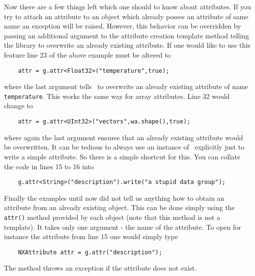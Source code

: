 Now there are a few things left which one should to know about attributes. 
If you try to attach an attribute to an object which already posses an attribute
of same name an exception will be raised. However, this behavior can be
overridden by passing an additional argument to the attribute creation template
method telling the library to overwrite an already existing attribute. 
If one would like to use this feature line 23 of the above example must be
altered to 
\begin{verbatim}
    attr = g.attr<Float32>("temperature",true);
\end{verbatim}
where the last argument tells \pninx\ to overwrite an already existing attribute
of name {\tt temperature}. 
This works the same way for array attributes. Line 32 would change to
\begin{verbatim}
    attr = g.attr<UInt32>("vectors",wa.shape(),true);
\end{verbatim}
where again the last argument ensures that an already existing attribute would
be overwritten. 
It can be tedious to always use an instance of \nxattribute\ explicitly just to
write a simple attribute. So there is a simple shortcut for this. 
You can collate the code in lines 15 to 16 into
\begin{verbatim}
    g.attr<String>("description").write("a stupid data group");
\end{verbatim}

Finally the examples until now did not tell us anything how to obtain an
attribute from an already existing object. 
This can be done simply using the {\tt attr()} method provided by each object
(note that this method is not a template). It takes only one argument - the name
of the attribute. To open for instance the attribute from line 15 one would
simply type
\begin{verbatim}
    NXAttribute attr = g.attr("description"); 
\end{verbatim}
The method throws an exception if the attribute does not exist.



